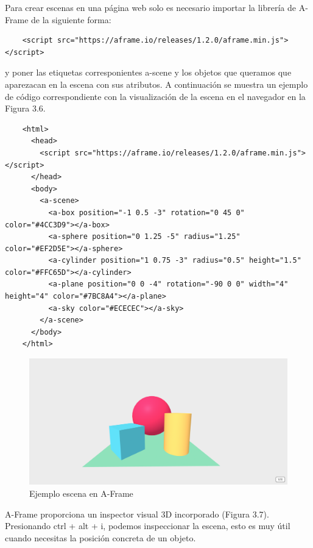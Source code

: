 Para crear escenas en una página web solo es necesario importar la librería de A-Frame de la siguiente forma: \begin{lstlisting}
    <script src="https://aframe.io/releases/1.2.0/aframe.min.js"></script>
\end{lstlisting} 
y poner las etiquetas corresponientes a-scene y los objetos que queramos que aparezacan en la escena con sus atributos.
A continuación se muestra un ejemplo de código correspondiente con la visualización de la escena en el navegador en la Figura 3.6.
\\
\begin{lstlisting}
    <html>
      <head>
        <script src="https://aframe.io/releases/1.2.0/aframe.min.js"></script>
      </head>
      <body>
        <a-scene>
          <a-box position="-1 0.5 -3" rotation="0 45 0" color="#4CC3D9"></a-box>
          <a-sphere position="0 1.25 -5" radius="1.25" color="#EF2D5E"></a-sphere>
          <a-cylinder position="1 0.75 -3" radius="0.5" height="1.5" color="#FFC65D"></a-cylinder>
          <a-plane position="0 0 -4" rotation="-90 0 0" width="4" height="4" color="#7BC8A4"></a-plane>
          <a-sky color="#ECECEC"></a-sky>
        </a-scene>
      </body>
    </html>
\end{lstlisting}

\begin{figure}[H]
    \centering
    \includegraphics[width=1\textwidth, height=0.5\textwidth]{chapters/images/aframe.png}
    \caption{Ejemplo escena en A-Frame}
    \label{fig:my_label}
\end{figure}

A-Frame proporciona un inspector visual 3D incorporado (Figura 3.7). Presionando ctrl + alt + i, podemos inspeccionar la escena, esto es muy útil cuando necesitas la posición concreta de un objeto.

